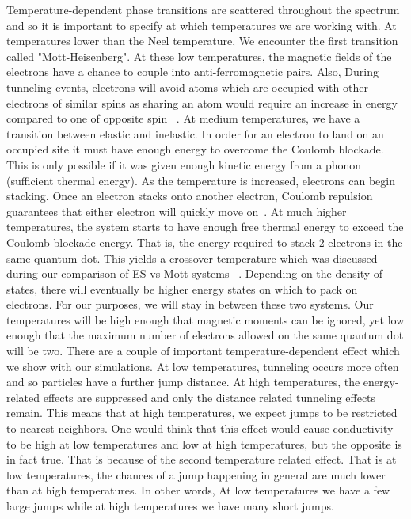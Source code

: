 Temperature-dependent phase transitions are scattered throughout the spectrum and so it is important to specify at which temperatures we are working with. At temperatures lower than the Neel temperature, We encounter the first transition called "Mott-Heisenberg". At these low temperatures, the magnetic fields of the electrons have a chance to couple into anti-ferromagnetic pairs. Also, During tunneling events, electrons will avoid atoms which are occupied with other electrons of similar spins as sharing an atom would require an increase in energy compared to one of opposite spin ~\cite{Gebhard03}. At medium temperatures, we have a transition between elastic and inelastic. In order for an electron to land on an occupied site it must have enough energy to overcome the Coulomb blockade. This is only possible if it was given enough kinetic energy from a phonon (sufficient thermal energy). As the temperature is increased, electrons can begin stacking. Once an electron stacks onto another electron, Coulomb repulsion guarantees that either electron will quickly move on~\cite{Glazman05}. At much higher temperatures, the system starts to have enough free thermal energy to exceed the Coulomb blockade energy. That is, the energy required to stack 2 electrons in the same quantum dot. This yields a crossover temperature which was discussed during our comparison of ES vs Mott systems ~\cite{aharony92}. Depending on the density of states, there will eventually be higher energy states on which to pack on electrons. For our purposes, we will stay in between these two systems. Our temperatures will be high enough that magnetic moments can be ignored, yet low enough that the maximum number of electrons allowed on the same quantum dot will be two. There are a couple of important temperature-dependent effect which we show with our simulations. At low temperatures, tunneling occurs more often and so particles have a further jump distance. At high temperatures, the energy-related effects are suppressed and only the distance related tunneling effects remain. This means that at high temperatures, we expect jumps to be restricted to nearest neighbors. One would think that this effect would cause conductivity to be high at low temperatures and low at high temperatures, but the opposite is in fact true. That is because of the second temperature related effect. That is at low temperatures, the chances of a jump happening in general are much lower than at high temperatures. In other words, At low temperatures we have a few large jumps while at high temperatures we have many short jumps. 

